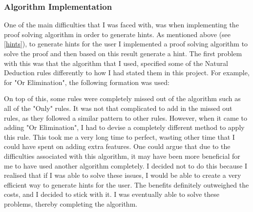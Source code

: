 \subsubsection{Algorithm Implementation}
One of the main difficulties that I was faced with, was when implementing the proof solving algorithm in order to generate hints. As mentioned above (see \ref{hints}), to generate hints for the user I implemented a proof solving algorithm to solve the proof and then based on this result generate a hint. The first problem with this was that the algorithm that I used, specified some of the Natural Deduction rules differently to how I had stated them in this project. For example, for "Or Elimination", the following formation was used:

	\begin{figure}[!ht]
		\centering
	\begin{bprooftree}
	\end{bprooftree}
	\end{figure}

 On top of this, some rules were completely missed out of the algorithm such as all of the "Only" rules. It was not that complicated to add in the missed out rules, as they followed a similar pattern to other rules. However, when it came to adding "Or Elimination", I had to devise a completely different method to apply this rule. This took me a very long time to perfect, wasting other time that I could have spent on adding extra features. One could argue that due to the difficulties associated with this algorithm, it may have been more beneficial for me to have used another algorithm completely. I decided not to do this because I realised that if I was able to solve these issues, I would be able to create a very efficient way to generate hints for the user. The benefits definitely outweighed the costs, and I decided to stick with it. I was eventually able to solve these problems, thereby completing the algorithm. 

